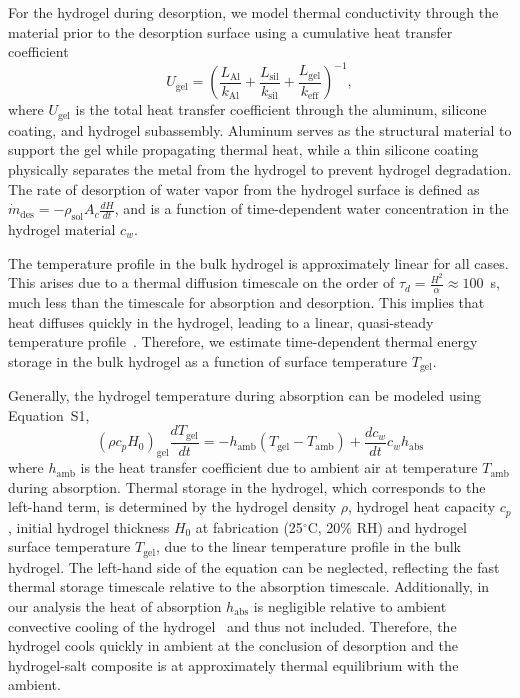 \documentclass[11pt]{article}
\begin{document}
For the hydrogel during desorption, we model thermal conductivity through the material prior to the desorption surface using a cumulative heat transfer coefficient
\begin{equation}
U_{\mathrm{gel}} = \left(\frac{L_{\mathrm{Al}}}{k_{\mathrm{Al}}} + \frac{L_{\mathrm{sil}}}{k_{\mathrm{sil}}} + \frac{L_{\mathrm{gel}}}{k_{\mathrm{eff}}}\right)^{-1},
\end{equation}
where $U_{\mathrm{gel}}$ is the total heat transfer coefficient through the aluminum, silicone coating, and hydrogel subassembly. Aluminum serves as the structural material to support the gel while propagating thermal heat, while a thin silicone coating physically separates the metal from the hydrogel to prevent hydrogel degradation. The rate of desorption of water vapor from the hydrogel surface is defined as $\dot{m}_{\mathrm{des}} = -\rho_{\mathrm{sol}} A_c \frac{dH}{dt}$, and is a function of time-dependent water concentration in the hydrogel material $c_w$.

The temperature profile in the bulk hydrogel is approximately linear for all cases. This arises due to a thermal diffusion timescale on the order of $\tau_d = \frac{H^2}{\alpha} \approx 100$~s, much less than the timescale for absorption and desorption. This implies that heat diffuses quickly in the hydrogel, leading to a linear, quasi-steady temperature profile~\cite{sdiazmarin2022}. Therefore, we estimate time-dependent thermal energy storage in the bulk hydrogel as a function of surface temperature $T_{\mathrm{gel}}$.

Generally, the hydrogel temperature during absorption can be modeled using Equation~S1,
\begin{equation}
\left(\rho c_p H_0\right)_{\mathrm{gel}} \frac{dT_{\mathrm{gel}}}{dt} = -h_{\mathrm{amb}}\left(T_{\mathrm{gel}} - T_{\mathrm{amb}}\right) + \frac{dc_w}{dt} c_w h_{\mathrm{abs}}
\end{equation}
where $h_{\mathrm{amb}}$ is the heat transfer coefficient due to ambient air at temperature $T_{\mathrm{amb}}$ during absorption. Thermal storage in the hydrogel, which corresponds to the left-hand term, is determined by the hydrogel density $\rho$, hydrogel heat capacity $c_p$, initial hydrogel thickness $H_0$ at fabrication (25$^\circ$C, 20\% RH) and hydrogel surface temperature $T_{\mathrm{gel}}$, due to the linear temperature profile in the bulk hydrogel. The left-hand side of the equation can be neglected, reflecting the fast thermal storage timescale relative to the absorption timescale. Additionally, in our analysis the heat of absorption $h_{\mathrm{abs}}$ is negligible relative to ambient convective cooling of the hydrogel~\cite{sdiazmarin2022b} and thus not included. Therefore, the hydrogel cools quickly in ambient at the conclusion of desorption and the hydrogel-salt composite is at approximately thermal equilibrium with the ambient.
\end{document}
